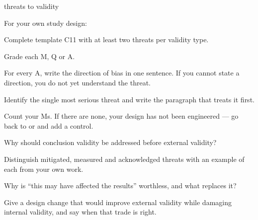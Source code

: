 \begin{traditions}{threats to validity}
\end{traditions}

\begin{lab}
For your own study design:

\begin{tightnum}
  \item Complete template C11 with at least two threats per validity type.
  \item Grade each M, Q or A.
  \item For every A, write the direction of bias in one sentence. If you cannot
    state a direction, you do not yet understand the threat.
  \item Identify the single most serious threat and write the paragraph that
    treats it first.
  \item Count your Ms. If there are none, your design has not been engineered
    --- go back to  or  and add a control.
\end{tightnum}
\end{lab}

\begin{checkpoint}
\begin{tightnum}
  \item Why should conclusion validity be addressed before external validity?
  \item Distinguish mitigated, measured and acknowledged threats with an
    example of each from your own work.
  \item Why is ``this may have affected the results'' worthless, and what
    replaces it?
  \item Give a design change that would improve external validity while
    damaging internal validity, and say when that trade is right.
\end{tightnum}
\end{checkpoint}

